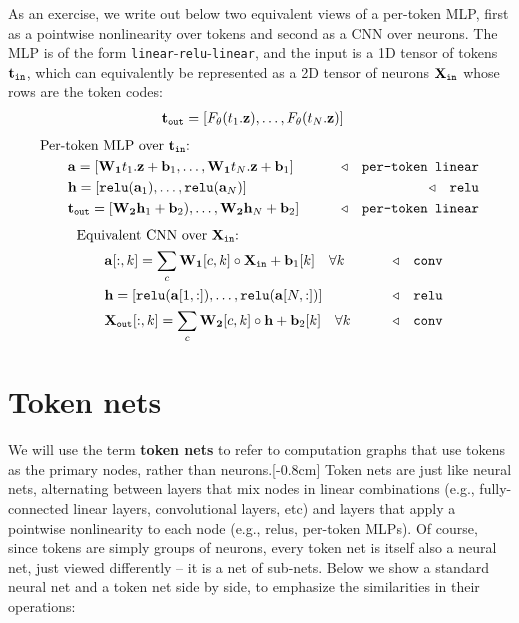 As an exercise, we write out below two equivalent views of a per-token MLP, first as a pointwise nonlinearity over tokens and second as a CNN over neurons. The MLP is of the form \texttt{linear}-\texttt{relu}-\texttt{linear}, and the input is a 1D tensor of tokens $\mathbf{t}_{\texttt{in}}$, which can equivalently be represented as a 2D tensor of neurons $\mathbf{X}_{\texttt{in}}$ whose rows are the token codes:
\begin{align}
    &\mathbf{t}_{\texttt{out}} = [F_{\theta}(t_1.\mathbf{z}), \ldots, F_{\theta}(t_N.\mathbf{z})]
\end{align}
\begin{align}
    &\text{Per-token MLP over $\mathbf{t}_{\texttt{in}}$:}\nonumber \\
    &\quad\quad \mathbf{a} = [\mathbf{W_1}t_1.\mathbf{z} + \mathbf{b}_1, \ldots, \mathbf{W_1}t_N.\mathbf{z} + \mathbf{b}_1] &\quad\quad \triangleleft \quad \texttt{per-token linear}\\
    &\quad\quad \mathbf{h} = [\texttt{relu}(\mathbf{a}_1), \ldots, \texttt{relu}(\mathbf{a}_N)] &\quad\quad \triangleleft \quad \texttt{relu}\\
    &\quad\quad \mathbf{t}_{\texttt{out}} = [\mathbf{W_2}\mathbf{h}_1 + \mathbf{b}_2), \ldots, \mathbf{W_2}\mathbf{h}_N + \mathbf{b}_2] &\quad\quad \triangleleft \quad \texttt{per-token linear}
\end{align}
\begin{align}
    &\text{Equivalent CNN over $\mathbf{X}_{\texttt{in}}$:}\nonumber \\
    &\quad\quad \mathbf{a}[:,k] = \sum_c \mathbf{W_1}[c,k] \circ \mathbf{X}_{\texttt{in}} + \mathbf{b}_1[k] \quad \forall k &\quad\quad \triangleleft \quad \texttt{conv}\\
    &\quad\quad \mathbf{h} = [\texttt{relu}(\mathbf{a}[1,:]), \ldots, \texttt{relu}(\mathbf{a}[N,:])] &\quad\quad \triangleleft \quad \texttt{relu}\\
    &\quad\quad \mathbf{X}_{\texttt{out}}[:,k] = \sum_c \mathbf{W_2}[c,k] \circ \mathbf{h} + \mathbf{b}_2[k] \quad \forall k &\quad\quad \triangleleft \quad \texttt{conv}
\end{align}

\section{Token nets}

We will use the term \textbf{token nets} to refer to computation graphs that use tokens as the primary nodes, rather than neurons.[-0.8cm] Token nets are just like neural nets, alternating between layers that mix nodes in linear combinations (e.g., fully-connected linear layers, convolutional layers, etc) and layers that apply a pointwise nonlinearity to each node (e.g., relus, per-token MLPs). Of course, since tokens are simply groups of neurons, every token net is itself also a neural net, just viewed differently -- it is a net of sub-nets. Below we show a standard neural net and a token net side by side, to emphasize the similarities in their operations:


